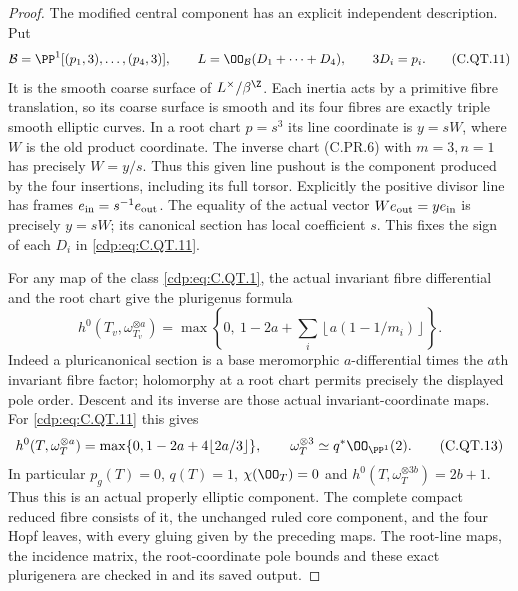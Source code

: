\begin{proof}
The modified central component
has an explicit independent
description. Put
\[
 \mathcal B=\PP^1[(p_1,3),\ldots,(p_4,3)],\qquad
 L=\OO_{\mathcal B}(D_1+\cdots+D_4),
 \qquad 3D_i=p_i.
\tag{C.QT.11}\label{cdp:eq:C.QT.11}
\]
It is the smooth coarse surface
of $L^\times/\beta^{\Z}$.
Each inertia acts by a primitive
fibre translation, so its coarse
surface is smooth and its four
fibres are exactly triple smooth
elliptic curves. In a root chart
$p=s^3$ its line coordinate is
$y=sW$, where $W$ is the old
product coordinate. The inverse
chart (C.PR.6) with $m=3,n=1$
has precisely $W=y/s$.
Thus this given line pushout
is the component produced by
the four insertions, including
its full torsor.
Explicitly the positive divisor
line has frames $e_{\rm in}=s^{-1}e_{\rm out}$.
The equality of the actual vector
$W e_{\rm out}=y e_{\rm in}$
is precisely $y=sW$; its canonical
section has local coefficient $s$.
This fixes the sign of each $D_i$
in \eqref{cdp:eq:C.QT.11}.

For any map of the class
\eqref{cdp:eq:C.QT.1}, the actual invariant
fibre differential and the
root chart give the plurigenus
formula
\[
 h^0(T_v,\omega_{T_v}^{\otimes a})
 =\max\left\{0,\ 1-2a+
       \sum_i\left\lfloor
                    a(1-1/m_i)\right\rfloor\right\}.
\tag{C.QT.12}\label{cdp:eq:C.QT.12}
\]
Indeed a pluricanonical section
is a base meromorphic
$a$-differential times the
$a$th invariant fibre factor;
holomorphy at a root chart
permits precisely the displayed
pole order. Descent and its
inverse are those actual
invariant-coordinate maps.
For \eqref{cdp:eq:C.QT.11} this gives
\[
 h^0(T,\omega_T^{\otimes a})
    =\max\{0,1-2a+4\lfloor2a/3\rfloor\},
 \qquad \omega_T^{\otimes3}\simeq q^*\OO_{\PP^1}(2).
\tag{C.QT.13}\label{cdp:eq:C.QT.13}
\]
In particular $p_g(T)=0$,
$q(T)=1$, $\chi(\OO_T)=0$
and $h^0(T,\omega_T^{\otimes3b})=2b+1$.
Thus this is an actual properly
elliptic component. The complete
compact reduced fibre consists
of it, the unchanged ruled core
component, and the four Hopf
leaves, with every gluing given
by the preceding maps.
The root-line maps, the incidence
matrix, the root-coordinate pole
bounds and these exact plurigenera
are checked in
and its saved output.
\end{proof}


